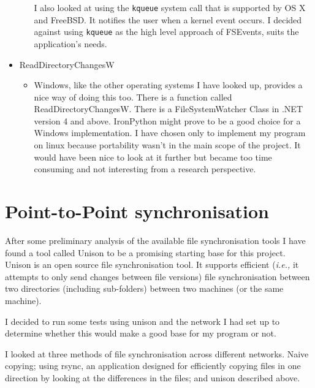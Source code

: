 \documentclass[12pt]{article}
\begin{document}
\begin{itemize}
\begin{itemize}
        I also looked at using the \texttt{kqueue}\cite{kqueue-man} system call that is
        supported by OS X and FreeBSD. It notifies the user
        when a kernel event occurs. I decided against using
        \texttt{kqueue} as the high level approach of FSEvents,
        suits the application's needs.
        \end{itemize}

    \item ReadDirectoryChangesW
        \begin{itemize}
        \item Windows, like the other operating systems
        I have looked up, provides a nice way of doing this
        too. There is a function called ReadDirectoryChangesW.
        There is a FileSystemWatcher Class in .NET version 4 and
        above. IronPython might prove to be a good choice for a
        Windows implementation. I have chosen only to implement
        my program on linux because portability wasn't in the main
        scope of the project. It would have been nice to look
        at it further but became too time consuming and not interesting
        from a research perspective.
        \end{itemize}
\end{itemize}

\section{Point-to-Point synchronisation}
After some preliminary analysis of the available file synchronisation
tools I have found a tool called Unison to be a promising starting
base for this project. Unison is an open source file synchronisation tool.
It supports efficient (\emph{i.e.,} it attempts to only send changes between file versions) file synchronisation between two
directories (including sub-folders) between two machines (or the same
machine).

I decided to run some tests using unison 
and the network
I had set up to determine whether this would make a good base for
my program or not.

I looked at three methods of file synchronisation across
different networks. Naive copying; using rsync, an application
designed for efficiently copying files in one direction by looking at
the differences in the files; and unison described above.
\end{document}
